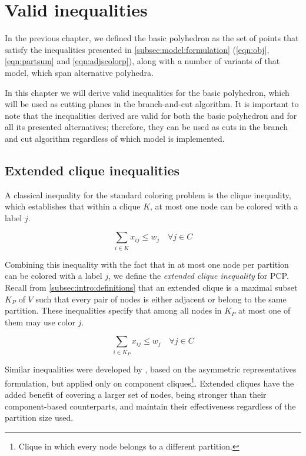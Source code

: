 
\chapter{Valid inequalities}
\label{sec:ineqs}

In the previous chapter, we defined the basic \PCP{} polyhedron as the set of points that satisfy the inequalities presented in \ref{subsec:model:formulation} (\ref{eqn:obj}, \ref{eqn:partsum} and \ref{eqn:adjscolorp}), along with a number of variants of that model, which span alternative polyhedra.

In this chapter we will derive valid inequalities for the basic \PCP{} polyhedron, which will be used as cutting planes in the branch-and-cut algorithm. It is important to note that the inequalities derived are valid for both the basic polyhedron and for all its presented alternatives; therefore, they can be used as cuts in the branch and cut algorithm regardless of which model is implemented.

\section{Extended clique inequalities}

A classical inequality for the standard coloring problem is the clique inequality, which establishes that within a clique $K$, at most one node can be colored with a label $j$.

\begin{equation}
\nonumber
\sum_{i \in K} x_{ij} \leq w_{j} \quad \forall j \in C
\end{equation}

Combining this inequality with the fact that in \PCP{} at most one node per partition can be colored with a label $j$, we define the \textit{extended clique inequality} for PCP. Recall from \ref{subsec:intro:definitions} that an extended clique is a maximal subset $K_P$ of $V$ such that every pair of nodes is either adjacent or belong to the same partition. These inequalities specify that among all nodes in $K_P$ at most one of them may use color $j$.

\begin{equation}
\label{ineq:extendedclique}
\sum_{i \in K_P} x_{ij} \leq w_{j} \quad \forall j \in C
\end{equation}

Similar inequalities were developed by \cite{frota2010branch}, based on the asymmetric representatives formulation, but applied only on component cliques\footnote{Clique in which every node belongs to a different partition.}. Extended cliques have the added benefit of covering a larger set of nodes, being stronger than their component-based counterparts, and maintain their effectiveness regardless of the partition size used.

